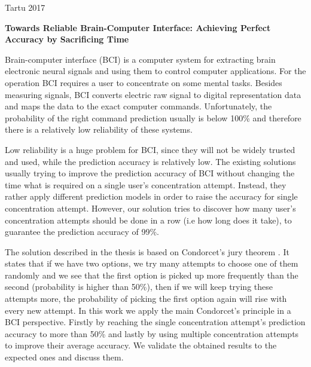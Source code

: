 \documentclass[12pt]{article}
\theoremstyle{definition}
\begin{document}
\vfill
\centerline{Tartu 2017}



\newpage
{}
\noindent\textbf{\large Towards Reliable Brain-Computer Interface: Achieving Perfect Accuracy by Sacrificing Time}
\vspace*{2ex}
{ }

Brain-computer interface (BCI) is a computer system for extracting brain electronic neural signals and using them to control computer applications. For the operation BCI requires a user to concentrate on some mental tasks. Besides measuring signals, BCI converts electric raw signal to digital representation data and maps the data to the exact computer commands. Unfortunately, the probability of the right command prediction usually is below 100\% and therefore there is a relatively low reliability of these systems.

Low reliability is a huge problem for BCI, since they will not be widely trusted and used, while the prediction accuracy is relatively low. The existing solutions usually trying to improve the prediction accuracy of BCI without changing the time what is required on a single user's concentration attempt. Instead, they rather apply different prediction models in order to raise the accuracy for single concentration attempt. However, our solution tries to discover how many user's concentration attempts should be done in a row (i.e how long does it take), to guarantee the prediction accuracy of 99\%.

The solution described in the thesis is based on Condorcet's jury theorem \cite{condorcets}. It states that if we have two options, we try many attempts to choose one of them randomly and we see that the first option is picked up more frequently than the second (probability is higher than 50\%), then if we will keep trying these attempts more, the probability of picking the first option again will rise with every new attempt. In this work we apply the main Condorcet's principle in a BCI perspective. Firstly by reaching the single concentration attempt's prediction accuracy to more than 50\% and lastly by using multiple concentration attempts to improve their average accuracy. We validate the obtained results to the expected ones and discuss them.
\end{document}
